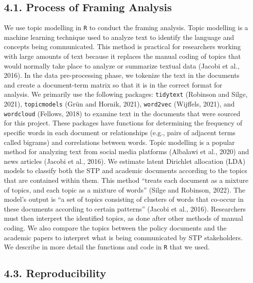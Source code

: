 \documentclass[]{elsarticle} %
\begin{document}
\hypertarget{process-of-framing-analysis}{%
\subsection{4.1. Process of Framing
Analysis}\label{process-of-framing-analysis}}

We use topic modelling in \texttt{R} to conduct the framing analysis.
Topic modelling is a machine learning technique used to analyze text to
identify the language and concepts being communicated. This method is
practical for researchers working with large amounts of text because it
replaces the manual coding of topics that would normally take place to
analyze or summarize textual data (Jacobi et al., 2016). In the data
pre-processing phase, we tokenize the text in the documents and create a
document-term matrix so that it is in the correct format for analysis.
We primarily use the following packages: \texttt{tidytext} (Robinson and
Silge, 2021), \texttt{topicmodels} (Grün and Hornik, 2021),
\texttt{word2vec} (Wijffels, 2021), and \texttt{wordcloud} (Fellows,
2018) to examine text in the documents that were sourced for this
project. These packages have functions for determining the frequency of
specific words in each document or relationships (e.g., pairs of
adjacent terms called bigrams) and correlations between words. Topic
modelling is a popular method for analyzing text from social media
platforms (Albalawi et al., 2020) and news articles (Jacobi et al.,
2016). We estimate latent Dirichlet allocation (LDA) models to classify
both the STP and academic documents according to the topics that are
contained within them. This method ``treats each document as a mixture
of topics, and each topic as a mixture of words'' (Silge and Robinson,
2022). The model's output is ``a set of topics consisting of clusters of
words that co-occur in these documents according to certain patterns''
(Jacobi et al., 2016). Researchers must then interpret the identified
topics, as done after other methods of manual coding. We also compare
the topics between the policy documents and the academic papers to
interpret what is being communicated by STP stakeholders. We describe in
more detail the functions and code in \texttt{R} that we used.

\hypertarget{reproducibility}{%
\subsection{4.3. Reproducibility}\label{reproducibility}}
\end{document}
